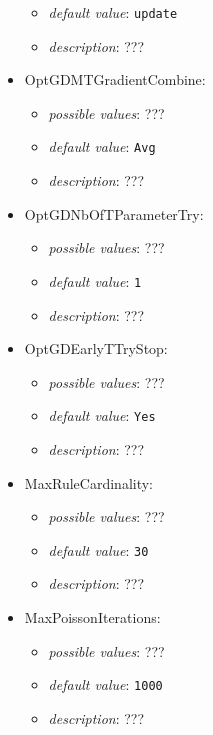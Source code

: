\documentclass{article}
\begin{document}
\begin{itemize}
\begin{itemize}
                \item \emph{default value}: \texttt{update}
                \item \emph{description}: ???
           \end{itemize}
    \item OptGDMTGradientCombine:
           \begin{itemize}
                \item \emph{possible values}: ???
                \item \emph{default value}: \texttt{Avg}
                \item \emph{description}: ???
           \end{itemize}
    \item OptGDNbOfTParameterTry:
           \begin{itemize}
                \item \emph{possible values}: ???
                \item \emph{default value}: \texttt{1}
                \item \emph{description}: ???
           \end{itemize}
    \item OptGDEarlyTTryStop:
           \begin{itemize}
                \item \emph{possible values}: ???
                \item \emph{default value}: \texttt{Yes}
                \item \emph{description}: ???
           \end{itemize}
    \item MaxRuleCardinality:
           \begin{itemize}
                \item \emph{possible values}: ???
                \item \emph{default value}: \texttt{30}
                \item \emph{description}: ???
           \end{itemize}
    \item MaxPoissonIterations:
           \begin{itemize}
                \item \emph{possible values}: ???
                \item \emph{default value}: \texttt{1000}
                \item \emph{description}: ???
           \end{itemize}

\end{itemize}
\end{document}
